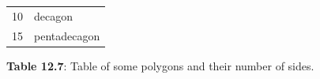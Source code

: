 {{\begin{center}
\begin{xtabular}[t]{|l|l|}
    
        10 &
    
    
        decagon%
     \tabularnewline{}
    
    
        15 &
    
    
        pentadecagon%
     \tabularnewline{}
    \end{xtabular}
      \end{center}
    \begin{center}{\small\bfseries Table 12.7}: Table of some polygons and their number of sides.\end{center}
    
    \addtocounter{footnote}{-0}
    
          } %
        }{%
        }
